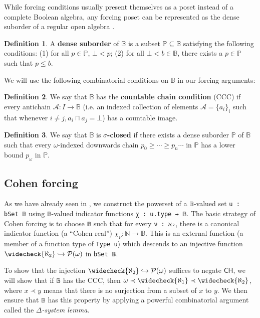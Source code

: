\documentclass[sigplan,10pt,review]{acmart}
\newcommand{\B}{\mathbb{B}}
\newcommand{\lil}{\lstinline}
\newcommand{\N}{\mathbb{N}}
\newcommand{\CH}{\mathsf{CH}}
\theoremstyle{definition}
\newtheorem{defn}{Definition}[section]
\begin{document}
While forcing conditions usually present themselves as a poset instead of a complete Boolean algebra, any forcing poset can be represented as the dense suborder of a regular open algebra \cite{moore2019method}.

\begin{defn}\label{def:dense-suborder}
  A \textbf{dense suborder} of \(\B\) is a subset \(\mathbb{P} \subseteq \B\) satisfying the following conditions: (1) for all \(p \in \mathbb{P}\), \(\bot < p\); (2) for all \(\bot < b \in \B\), there exists a \(p \in \mathbb{P}\) such that \(p \leq b\).
\end{defn}

We will use the following combinatorial conditions on \(\mathbb{B}\) in our forcing arguments:

\begin{defn}\label{def:ccc}
We say that $\B$ has the \textbf{countable chain condition} (CCC) if every antichain $\mathcal{A} : I \to \B$ (i.e. an indexed collection of elements $\mathcal{A} = \{a_i\}_i$ such that whenever $i \neq j, a_i \sqcap a_j = \bot$) has a countable image.
\end{defn}

\begin{defn}\label{def:sigma-closed}
We say that \(\B\) is \textbf{\(\sigma\)-closed} if there exists a dense suborder \(\mathbb{P}\) of \(\B\) such that every \(\omega\)-indexed downwards chain \(p_0 \geq \cdots \geq p_n \cdots\) in \(\mathbb{P}\) has a lower bound \(p_{\omega}\) in \(\mathbb{P}\).
\end{defn}

\subsection{Cohen forcing}

As we have already seen in , we construct the powerset of a \lil{𝔹}-valued set \lstinline{u : bSet 𝔹} using \lil{𝔹}-valued indicator functions \lil{χ : u.type → 𝔹}.
The basic strategy of Cohen forcing is to choose \lil{𝔹} such that for every \lil{ν : ℵ₂}, there is a canonical indicator function (a ``Cohen real'') \(\chi_{\nu} : \N \to \mathbb{B}\).
This is an external function (a member of a function type of \lstinline{Type u}) which descends to an injective function \(\widecheck{\aleph_2} \hookrightarrow \mathcal{P}(\omega)\) in \lil{bSet 𝔹}.

To show that the injection \(\widecheck{\aleph_2} \hookrightarrow \mathcal{P}(\omega)\)  suffices to negate \(\CH\), we will show that if \lil{𝔹} has the CCC, then \(\omega \prec \widecheck{\aleph_1} \prec \widecheck{\aleph_2}\), where $x\prec y$ means that there is no surjection from a subset of $x$ to $y$. We then ensure that \lil{𝔹} has this property by applying a powerful combinatorial argument called the \emph{\(\Delta\)-system lemma}.
\end{document}
